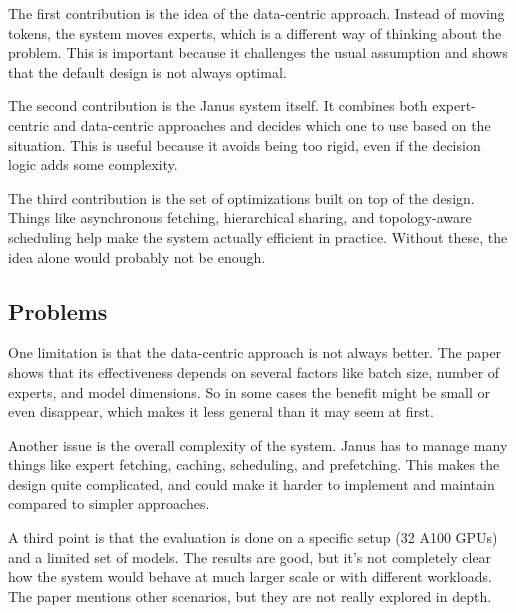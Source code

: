 \documentclass[a4paper, 12pt]{article}
\begin{document}
The first contribution is the idea of the data-centric approach. Instead of moving tokens, the system moves experts, which is a different way of thinking about the problem. This is important because it challenges the usual assumption and shows that the default design is not always optimal.

The second contribution is the Janus system itself. It combines both expert-centric and data-centric approaches and decides which one to use based on the situation. This is useful because it avoids being too rigid, even if the decision logic adds some complexity.

The third contribution is the set of optimizations built on top of the design. Things like asynchronous fetching, hierarchical sharing, and topology-aware scheduling help make the system actually efficient in practice. Without these, the idea alone would probably not be enough.

\subsection{Problems}

One limitation is that the data-centric approach is not always better. The paper shows that its effectiveness depends on several factors like batch size, number of experts, and model dimensions. So in some cases the benefit might be small or even disappear, which makes it less general than it may seem at first.

Another issue is the overall complexity of the system. Janus has to manage many things like expert fetching, caching, scheduling, and prefetching. This makes the design quite complicated, and could make it harder to implement and maintain compared to simpler approaches.

A third point is that the evaluation is done on a specific setup (32 A100 GPUs) and a limited set of models. The results are good, but it’s not completely clear how the system would behave at much larger scale or with different workloads. The paper mentions other scenarios, but they are not really explored in depth.
\end{document}
